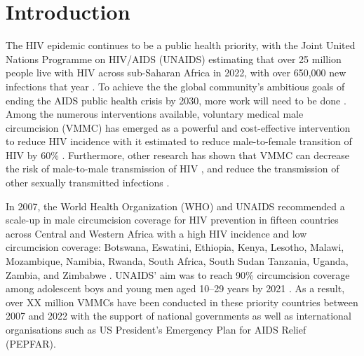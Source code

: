 \documentclass{article}
\begin{document}
\newpage



\section{Introduction}


The HIV epidemic continues to be a public health priority, with the Joint United Nations Programme on HIV/AIDS (UNAIDS) estimating that over 25 million people live with HIV across sub-Saharan Africa in 2022, with over 650,000 new infections that year \cite{UNAIDSStats}. To achieve the the global community's ambitious goals of ending the AIDS public health crisis by 2030, more work will need to be done \cite{UNAIDSStrategy}. Among the numerous interventions available, voluntary medical male circumcision (VMMC) has emerged as a powerful and cost-effective intervention to reduce HIV incidence \cite{bansi2023cost} with it estimated to reduce male-to-female transition of HIV by 60\% \cite{gray2007male, bailey2007male, auvert2005randomized, gray2012effectiveness, grund2017association}. Furthermore, other research has shown that VMMC can decrease the risk of male-to-male transmission of HIV \cite{pintye2019benefits}, and reduce the transmission of other sexually transmitted infections \cite{tobian2009male}. 

In 2007, the World Health Organization (WHO) and UNAIDS recommended a scale-up in male circumcision coverage for HIV prevention in fifteen countries across Central and Western Africa with a high HIV incidence and low circumcision coverage: Botswana, Eswatini, Ethiopia, Kenya, Lesotho, Malawi, Mozambique, Namibia, Rwanda, South Africa, South Sudan Tanzania, Uganda, Zambia, and Zimbabwe \cite{UNAIDSJoint, davis2018progress, WHOVoluntary2}. UNAIDS' aim was to reach 90\% circumcision coverage among adolescent boys and young men aged 10--29 years by 2021 \cite{WHOFramework}. As a result, over XX million VMMCs have been conducted in these priority countries between 2007 and 2022 with the support of national governments as well as international organisations such as US President’s Emergency Plan for AIDS Relief (PEPFAR). 
\end{document}
